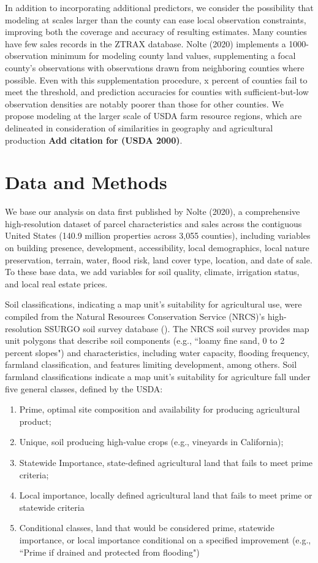 \documentclass[12pt]{article}
\begin{document}
In addition to incorporating additional predictors, we consider the possibility that modeling at scales larger than the county can ease local observation constraints, improving both the coverage and accuracy of resulting estimates. Many counties have few sales records in the ZTRAX database. Nolte (2020) implements a 1000-observation minimum for modeling county land values, supplementing a focal county’s observations with observations drawn from neighboring counties where possible. Even with this supplementation procedure, x percent of counties fail to meet the threshold, and prediction accuracies for counties with sufficient-but-low observation densities are notably poorer than those for other counties. We propose modeling at the larger scale of USDA farm resource regions, which are delineated in consideration of similarities in geography and agricultural production \textbf{Add citation for (USDA 2000)}.




\section{Data and Methods}
We base our analysis on data first published by Nolte (2020), a comprehensive high-resolution dataset of parcel characteristics and sales across the contiguous United States (140.9 million properties across 3,055 counties), including variables on building presence, development, accessibility, local demographics, local nature preservation, terrain, water, flood risk, land cover type, location, and date of sale. To these base data, we add variables for soil quality, climate, irrigation status, and local real estate prices.

Soil classifications, indicating a map unit's suitability for agricultural use, were compiled from the Natural Resources Conservation Service (NRCS)’s high-resolution SSURGO soil survey database (\cite{SoilSurveyStaffSoilStates}). The NRCS soil survey provides map unit polygons that describe soil components (e.g., ``loamy fine sand, 0 to 2 percent slopes") and characteristics, including water capacity, flooding frequency, farmland classification, and features limiting development, among others. Soil farmland classifications indicate a map unit's suitability for agriculture fall under five general classes, defined by the USDA:
\begin{enumerate}
    \item Prime, optimal site composition and availability for producing agricultural product;  
    \item Unique, soil producing high-value crops (e.g., vineyards in California); 
    \item Statewide Importance, state-defined agricultural land that fails to meet prime criteria;
    \item Local importance, locally defined agricultural land that fails to meet prime or statewide criteria
    \item Conditional classes, land that would be considered prime, statewide importance, or local importance conditional on a specified improvement (e.g., ``Prime if drained and protected from flooding")
\end{enumerate}
\end{document}

